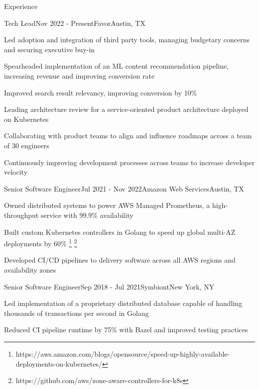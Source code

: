 \documentclass[
	10pt, %
]{resume} %
\begin{document}

\begin{rSection}{Experience}

	\begin{rSubsection}{Tech Lead}{Nov 2022 - Present}{Favor}{Austin, TX}
        \item Led adoption and integration of third party tools, managing budgetary concerns and securing executive buy-in
        \item Spearheaded implementation of an ML content recommendation pipeline, increasing revenue and improving conversion rate
        \item Improved search result relevancy, improving conversion by 10\%
        \item Leading architecture review for a service-oriented product architecture deployed on Kubernetes
        \item Collaborating with product teams to align and influence roadmaps across a team of 30 engineers
        \item Continuously improving development processes across teams to increase developer velocity
	\end{rSubsection}


    \begin{rSubsection}{Senior Software Engineer}{Jul 2021 - Nov 2022}{Amazon Web Services}{Austin, TX}
        \item Owned distributed systems to power AWS Managed Prometheus, a high-throughput service with 99.9\% availability
        \item Built custom Kubernetes controllers in Golang to speed up global multi-AZ deployments by 60\% \footnote{https://aws.amazon.com/blogs/opensource/speed-up-highly-available-deployments-on-kubernetes/} \footnote{https://github.com/aws/zone-aware-controllers-for-k8s}
        \item Developed CI/CD pipelines to delivery software across all AWS regions and availability zones
    \end{rSubsection}
    

    \begin{rSubsection}{Senior Software Engineer}{Sep 2018 - Jul 2021}{Symbiont}{New York, NY}
        \item Led implementation of a proprietary distributed database capable of handling thousands of transactions per second in Golang
        \item Reduced CI pipeline runtime by 75\% with Bazel and improved testing practices
    \end{rSubsection}


\end{rSection}
\end{document}
